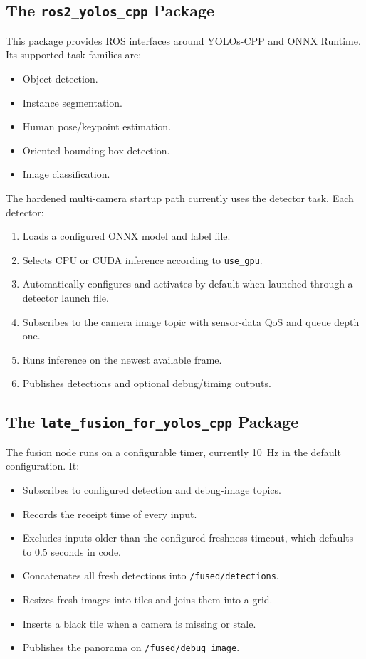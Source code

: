 \documentclass[11pt,a4paper]{article}
\newcommand{\ort}{ONNX Runtime}
\begin{document}
\subsection{The \texttt{ros2\_yolos\_cpp} Package}

This package provides ROS interfaces around YOLOs-CPP and \ort. Its supported task families are:

\begin{itemize}
  \item Object detection.
  \item Instance segmentation.
  \item Human pose/keypoint estimation.
  \item Oriented bounding-box detection.
  \item Image classification.
\end{itemize}

The hardened multi-camera startup path currently uses the detector task. Each detector:

\begin{enumerate}
  \item Loads a configured ONNX model and label file.
  \item Selects CPU or CUDA inference according to \texttt{use\_gpu}.
  \item Automatically configures and activates by default when launched through a detector launch file.
  \item Subscribes to the camera image topic with sensor-data QoS and queue depth one.
  \item Runs inference on the newest available frame.
  \item Publishes detections and optional debug/timing outputs.
\end{enumerate}

\subsection{The \texttt{late\_fusion\_for\_yolos\_cpp} Package}

The fusion node runs on a configurable timer, currently 10~Hz in the default configuration. It:

\begin{itemize}
  \item Subscribes to configured detection and debug-image topics.
  \item Records the receipt time of every input.
  \item Excludes inputs older than the configured freshness timeout, which defaults to 0.5 seconds in code.
  \item Concatenates all fresh detections into \texttt{/fused/detections}.
  \item Resizes fresh images into tiles and joins them into a grid.
  \item Inserts a black tile when a camera is missing or stale.
  \item Publishes the panorama on \texttt{/fused/debug\_image}.
\end{itemize}
\end{document}
